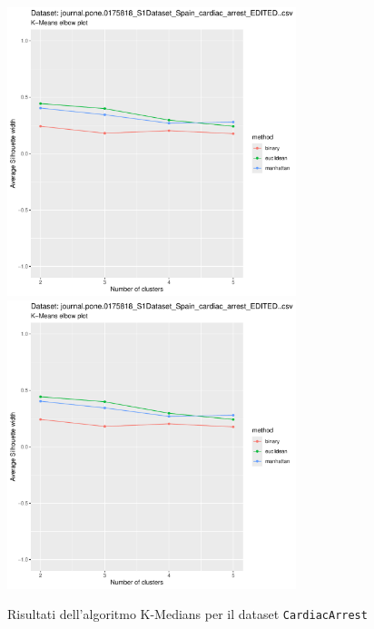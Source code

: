 \documentclass[a4paper, 12pt]{report}
\begin{document}
			\begin{figure}[H]
				\centering
				\includegraphics[width = 0.75\textwidth, height = 0.45\textheight, page = 3]{
					results/results_CardiacArrest.csv.pdf
				}
				\includegraphics[width = 0.75\textwidth, height = 0.45\textheight, page = 4]{
					results/results_CardiacArrest.csv.pdf
				}
				\caption{Risultati dell'algoritmo K-Medians per il dataset
				\texttt{CardiacArrest}}
				\label{fig:kmedians2}
			\end{figure}
\end{document}
